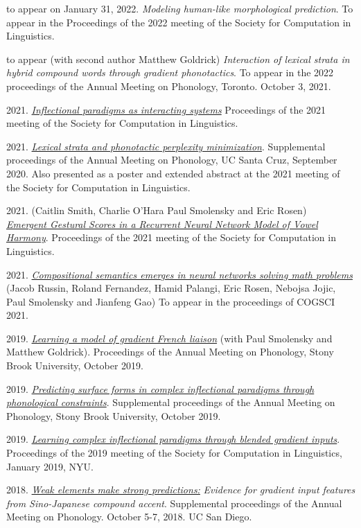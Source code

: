 \documentclass[11pt]{article}
\newcommand{\itt}[1]{\textit{#1}}
\newcommand{\ii}{\item}
\begin{document}
\begin{enumerate}[label={[\arabic*]}]
\ii to appear on January 31, 2022.  \textit{Modeling human-like morphological prediction}.  To appear in the Proceedings of the 2022 meeting of the Society for Computation in Linguistics.
\ii to appear (with second author Matthew Goldrick) \textit{Interaction of lexical strata in hybrid compound words through gradient phonotactics}. To appear in the 2022 proceedings of the Annual Meeting on Phonology, Toronto. October 3, 2021.
\ii 2021. \href{https://scholarworks.umass.edu/scil/vol4/iss1/14/}{\itt{Inflectional paradigms as interacting systems}} Proceedings of the 2021 meeting of the Society for Computation in Linguistics.
\ii 2021. \href{https://scholarworks.umass.edu/scil/vol4/iss1/49/}{\itt{Lexical strata and phonotactic perplexity minimization}}. Supplemental proceedings of the Annual Meeting on Phonology, UC Santa Cruz, September 2020. Also presented as a poster and extended abstract at the 2021 meeting of the Society for Computation in Linguistics.
\ii 2021. (Caitlin Smith, Charlie O'Hara Paul Smolensky and Eric Rosen) \\\href{https://caitlinsmith14.github.io/pdf/smithetal_scil2021_paper.pdf}{\itt{Emergent Gestural Scores in a Recurrent Neural Network Model of Vowel Harmony}}. Proceedings of the 2021 meeting of the Society for Computation in Linguistics.
\ii 2021. \href{https://en.x-mol.com/paper/article/1395477939799703552}{\itt{Compositional semantics emerges in neural networks solving math problems}} (Jacob Russin, Roland Fernandez, Hamid Palangi, Eric Rosen, Nebojsa Jojic, Paul Smolensky and Jianfeng Gao) To appear in the proceedings of COGSCI 2021.
\ii 2019. \href{https://journals.linguisticsociety.org/proceedings/index.php/amphonology/article/view/4680}{\itt{Learning a model of gradient French liaison}} (with Paul Smolensky and Matthew Goldrick). Proceedings of the Annual Meeting on Phonology, Stony Brook University, October 2019.
\ii  2019. \href{https://journals.linguisticsociety.org/proceedings/index.php/amphonology/article/view/4683}{\itt{Predicting surface forms in complex inflectional paradigms through phonological constraints}}. Supplemental proceedings of the Annual Meeting on Phonology, Stony Brook University, October 2019.
\ii 2019. \href{https://scholarworks.umass.edu/scil/vol2/iss1/12/}{\itt{Learning complex inflectional paradigms through blended gradient inputs}}. Proceedings of the 2019 meeting of the Society for Computation in Linguistics, January 2019, NYU. 
\ii 2018. \href{https://journals.linguisticsociety.org/proceedings/index.php/amphonology/article/view/4571}{\itt{Weak elements make strong predictions:}} \itt{Evidence for gradient input features from Sino-Japanese compound accent}. Supplemental proceedings of the Annual Meeting on Phonology. October 5-7, 2018. UC San Diego.

\end{enumerate}
\end{document}
